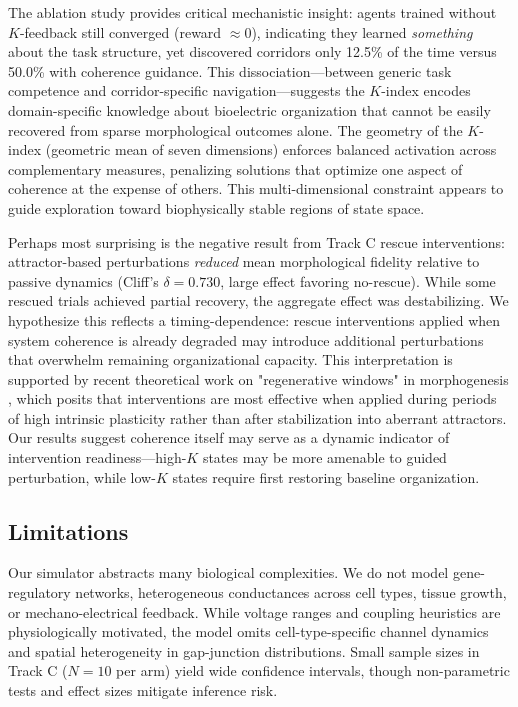 \documentclass[10pt,letterpaper]{article}
\begin{document}
The ablation study provides critical mechanistic insight: agents trained without $K$-feedback still converged (reward $\approx 0$), indicating they learned \emph{something} about the task structure, yet discovered corridors only 12.5\% of the time versus 50.0\% with coherence guidance. This dissociation—between generic task competence and corridor-specific navigation—suggests the $K$-index encodes domain-specific knowledge about bioelectric organization that cannot be easily recovered from sparse morphological outcomes alone. The geometry of the $K$-index (geometric mean of seven dimensions) enforces balanced activation across complementary measures, penalizing solutions that optimize one aspect of coherence at the expense of others. This multi-dimensional constraint appears to guide exploration toward biophysically stable regions of state space.

Perhaps most surprising is the negative result from Track C rescue interventions: attractor-based perturbations \emph{reduced} mean morphological fidelity relative to passive dynamics (Cliff's $\delta = 0.730$, large effect favoring no-rescue). While some rescued trials achieved partial recovery, the aggregate effect was destabilizing. We hypothesize this reflects a timing-dependence: rescue interventions applied when system coherence is already degraded may introduce additional perturbations that overwhelm remaining organizational capacity. This interpretation is supported by recent theoretical work on "regenerative windows" in morphogenesis \cite{durant2017long}, which posits that interventions are most effective when applied during periods of high intrinsic plasticity rather than after stabilization into aberrant attractors. Our results suggest coherence itself may serve as a dynamic indicator of intervention readiness—high-$K$ states may be more amenable to guided perturbation, while low-$K$ states require first restoring baseline organization.

\subsection*{Limitations}

Our simulator abstracts many biological complexities. We do not model gene-regulatory networks, heterogeneous conductances across cell types, tissue growth, or mechano-electrical feedback. While voltage ranges and coupling heuristics are physiologically motivated, the model omits cell-type-specific channel dynamics and spatial heterogeneity in gap-junction distributions. Small sample sizes in Track C ($N = 10$ per arm) yield wide confidence intervals, though non-parametric tests and effect sizes mitigate inference risk.
\end{document}
